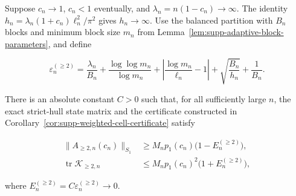 \begin{lemma}
\label{lem:supp-adaptive-hull-squeeze}
Suppose \(c_n\to1\), \(c_n<1\) eventually, and
\(\lambda_n=n(1-c_n)\to\infty\).  The identity
\(h_n=\lambda_n(1+c_n)\ell_n^2/\pi^2\) gives \(h_n\to\infty\).  Use the
balanced partition with \(B_n\) blocks and minimum block size \(m_n\) from
Lemma~\ref{lem:supp-adaptive-block-parameters}, and define

\[
 \varepsilon_n^{(\ge2)}=
 \frac{\lambda_n}{B_n}
 +\frac{\log\log m_n}{\log m_n}
 +\left|\frac{\log m_n}{\ell_n}-1\right|
 +\sqrt{\frac{B_n}{h_n}}
 +\frac1{B_n}.
\]

There is an absolute constant \(C>0\) such that, for all sufficiently large
\(n\), the exact strict-hull state matrix and the certificate constructed in
Corollary~\ref{cor:supp-weighted-cell-certificate} satisfy

\begin{align}
 \|A_{\ge2,n}(c_n)\|_{S_1}
 &\ge M_np_1(c_n)\bigl(1-E_n^{(\ge2)}\bigr),
 \label{eq:supp-adaptive-hull-lower}\\
 \operatorname{tr}\mathcal K_{\ge2,n}
 &\le M_np_1(c_n)^2\bigl(1+E_n^{(\ge2)}\bigr),
 \label{eq:supp-adaptive-hull-upper}
\end{align}

where \(E_n^{(\ge2)}=C\varepsilon_n^{(\ge2)}\to0\).
\end{lemma}

